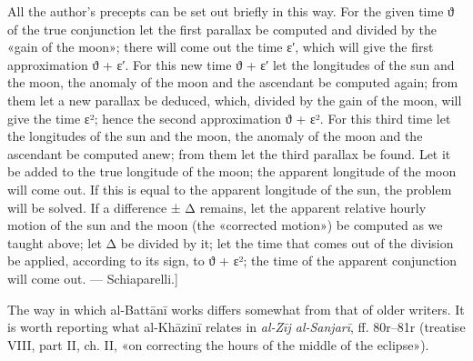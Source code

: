 \documentclass[11pt]{article}
\begin{document}
\par All the author's precepts can be set out briefly in this way. For the given time {\greekfont ϑ} of the true conjunction let the first parallax be computed and divided by the «gain of the moon»; there will come out the time {\greekfont ε}′, which will give the first approximation {\greekfont ϑ} + {\greekfont ε}′. For this new time {\greekfont ϑ} + {\greekfont ε}′ let the longitudes of the sun and the moon, the anomaly of the moon and the ascendant be computed again; from them let a new parallax be deduced, which, divided by the gain of the moon, will give the time {\greekfont ε}²; hence the second approximation {\greekfont ϑ} + {\greekfont ε}². For this third time let the longitudes of the sun and the moon, the anomaly of the moon and the ascendant be computed anew; from them let the third parallax be found. Let it be added to the true longitude of the moon; the apparent longitude of the moon will come out. If this is equal to the apparent longitude of the sun, the problem will be solved. If a difference ± {\greekfont Δ} remains, let the apparent relative hourly motion of the sun and the moon (the «corrected motion») be computed as we taught above; let {\greekfont Δ} be divided by it; let the time that comes out of the division be applied, according to its sign, to {\greekfont ϑ} + {\greekfont ε}²; the time of the apparent conjunction will come out. — Schiaparelli.]\par
\par The way in which al-Battānī works differs somewhat from that of older writers. It is worth reporting what al-Khāzinī relates in \emph{al-Zīj al-Sanjarī}, ff. 80r–81r (treatise VIII, part II, ch. II, «on correcting the hours of the middle of the eclipse»).\par
\end{document}
